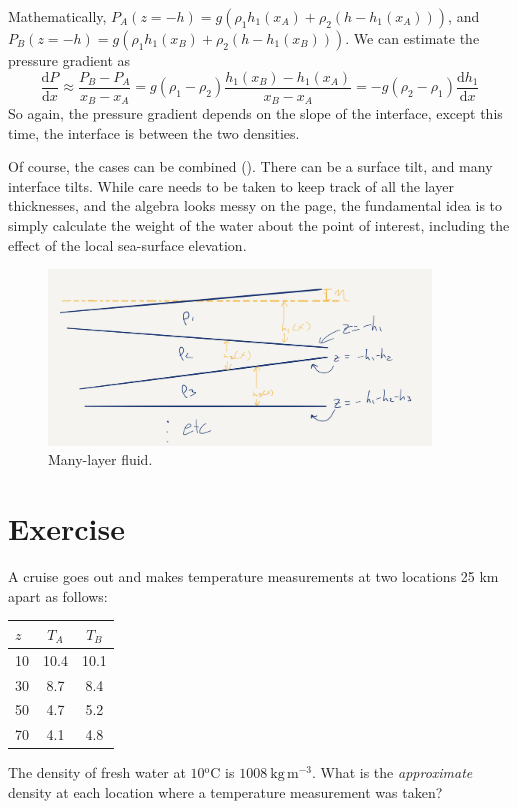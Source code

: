 Mathematically, $P_{A}(z=-h) = g(\rho_{1} h_{1}(x_{A}) + \rho_{2} (h-h_{1}(x_{A})))$, and
$P_{B}(z=-h) = g(\rho_{1} h_{1}(x_{B}) + \rho_{2} (h-h_{1}(x_{B})))$.  We can estimate the pressure gradient as
\begin{equation}
\frac{\mathrm{d}P}{\mathrm{d}x} \approx \frac{P_{B}-P_{A}}{x_{B}-x_{A}} = g(\rho_{1}-\rho_{2})\frac{h_{1}(x_{B})-h_{1}(x_{A})}{x_{B}-x_{A}} = -g(\rho_{2}-\rho_{1})\frac{\mathrm{d}h_1}{\mathrm{d}x}
\end{equation}
So again, the pressure gradient depends on the slope of the interface, except this time, the interface is between the two densities.

Of course, the cases can be combined ().  There can be a surface tilt, and many interface tilts.  While care needs to be taken to keep track of all the layer thicknesses, and the algebra looks messy on the page, the fundamental idea is to simply calculate the weight of the water about the point of interest, including the effect of the local sea-surface elevation.

\begin{figure}[htbp]
\begin{center}
\includegraphics[width=4in]{figs/MultipleLayers.png}
\caption{Many-layer fluid.}
\label{fig:MultipleLayers}
\end{center}
\end{figure}

\clearpage
\section{Exercise}

A cruise goes out and makes temperature measurements at two locations 25 km apart as follows:

  \begin{tabular}{l|cc}
    $z$& $T_A$& $T_B$\\
    \hline
    10 & 10.4& 10.1 \\
    30 & 8.7 & 8.4\\
    50 & 4.7 & 5.2\\
    70 & 4.1 & 4.8\\
  \end{tabular}
The density of fresh water at $10\mathrm{^oC}$ is $1008\ \mathrm{kg\,m^{-3}}$.  What is the \emph{approximate} density at each location where a temperature measurement was taken?

